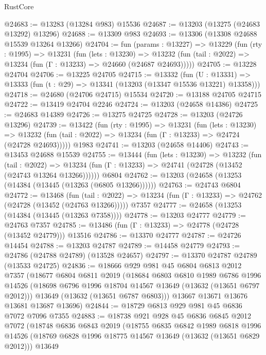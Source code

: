 \begin{lexlean}{RustCore}
\begin{coremodule}
@24683 := @13283 (@13284 @983) @15536
@24687 := @13203 (@13275 (@24683 @13292) @13296)
@24688 := @13309 @983
@24693 := @13306 (@13308 @24688 @15539 @13264 @13266)
@24704 := fun (params : @13227) =>
  @13229
    (fun (rty : @1995) =>
    @13231
      (fun (lets : @13230) =>
      @13232 (fun (tail : @2022) => @13234 (fun (Γ : @13233) => @24660 (@24687 @24693)))))
@24705 := @13228 @24704
@24706 := @13225 @24705
@24715 := @13332
    (fun (U : @13331) => @13333 (fun (t : @29) => @13341 (@13203 (@13347 @15536 @13221) @13358)))
@24718 := @24680 (@24706 @24715) @15534
@24720 := @13188 @24705 @24715
@24722 := @13419 @24704 @2246
@24724 := @13203 (@24658 @14386)
@24725 := @24683 @14389
@24726 := @13275 @24725
@24728 := @13203 (@24726 @13296)
@24739 := @13422
    (fun (rty : @1995) =>
    @13231
      (fun (lets : @13230) =>
      @13232 (fun (tail : @2022) => @13234 (fun (Γ : @13233) => @24724 (@24728 @24693)))))
    @1983
@24741 := @13203 (@24658 @14406)
@24743 := @13453 @24688 @15539
@24755 := @13444
    (fun (lets : @13230) =>
    @13232
      (fun (tail : @2022) =>
      @13234 (fun (Γ : @13233) => @24741 (@24728 (@13452 (@24743 @13264 @13266))))))
    @6804
@24762 := @13203 (@24658 (@13253 (@14384 (@13445 (@13263 (@6805 @13266))))))
@24763 := @24743 @6804
@24772 := @13468
    (fun (tail : @2022) => @13234 (fun (Γ : @13233) => @24762 (@24728 (@13452 (@24763 @13266)))))
    @7357
@24777 := @24658 (@13253 (@14384 (@13445 (@13263 @7358))))
@24778 := @13203 @24777
@24779 := @24763 @7357
@24785 := @13486 (fun (Γ : @13233) => @24778 (@24728 (@13452 @24779))) @13516
@24786 := @13370 @24777
@24787 := @24726 @14454
@24788 := @13203 @24787
@24789 := @14458 @24779
@24793 := @24786 (@24788 @24789) (@13528 @24657)
@24797 := @13370 @24787 @24789 (@13533 @24725)
@24836 := @18666
    @929
    @981
    @45
    @6804
    @6813
    @2012
    @7357
    (@18677
      @6804
      @6811
      @2019
      (@18684
        @6803
        @6810
        @1989
        @6786
        @1996
        @14526
        (@18698 @6796 @1996 @18704 @14567 @13649 (@13632 (@13651 @6797 @2012)))
        @13649
        (@13632 (@13651 @6787 @6803)))
      @13667
      @13671
      @13676
      @13681
      @13687
      @13696)
@24844 := @18729 @6813 @929 @981 @45 @6836 @7072 @7096 @7355
@24883 := @18738
    @921
    @928
    @45
    @6836
    @6845
    @2012
    @7072
    (@18748
      @6836
      @6843
      @2019
      (@18755
        @6835
        @6842
        @1989
        @6818
        @1996
        @14526
        (@18769 @6828 @1996 @18775 @14567 @13649 (@13632 (@13651 @6829 @2012)))
        @13649

\end{coremodule}
\end{lexlean}
